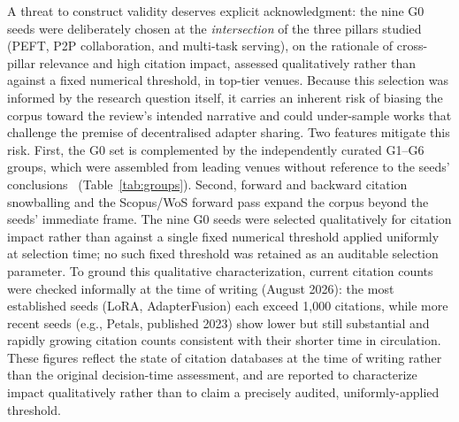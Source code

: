 A threat to construct validity deserves explicit acknowledgment: the nine G0
seeds were deliberately chosen at the \emph{intersection} of the three pillars
studied (PEFT, P2P collaboration, and multi-task serving), on the rationale of
cross-pillar relevance and high citation impact, assessed qualitatively
rather than against a fixed numerical threshold, in top-tier venues. Because this selection was informed by the research
question itself, it carries an inherent risk of biasing the corpus toward the
review's intended narrative and could under-sample works that challenge the premise of
decentralised adapter sharing. Two features mitigate this risk. First, the G0
set is complemented by the independently curated G1--G6 groups, which were
assembled from leading venues without reference to the seeds'
conclusions~\cite{XiaoWatson2019} (Table~\ref{tab:groups}). Second, forward and
backward citation snowballing and the Scopus/WoS forward pass expand the corpus
beyond the seeds' immediate frame. The nine G0 seeds were selected
qualitatively for citation impact rather than against a single fixed
numerical threshold applied uniformly at selection time; no such fixed
threshold was retained as an auditable selection parameter. To ground this
qualitative characterization, current citation counts were checked
informally at the time of writing (August 2026): the most established seeds
(LoRA, AdapterFusion) each exceed 1,000 citations, while more recent seeds
(e.g., Petals, published 2023) show lower but still substantial and rapidly
growing citation counts consistent with their shorter time in circulation.
These figures reflect the state of citation databases at the time of
writing rather than the original decision-time assessment, and are reported
to characterize impact qualitatively rather than to claim a precisely
audited, uniformly-applied threshold.

